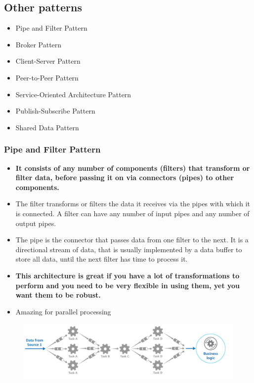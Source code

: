 \documentclass[a4paper]{article}
\begin{document}
\subsection{Other patterns}
\begin{itemize}
\item
  Pipe and Filter Pattern
\item
  Broker Pattern
\item
  Client-Server Pattern
\item
  Peer-to-Peer Pattern
\item
  Service-Oriented Architecture Pattern
\item
  Publish-Subscribe Pattern
\item
  Shared Data Pattern
\end{itemize}
\subsubsection{Pipe and Filter Pattern}
\begin{itemize}
\item  \textbf{It consists of any number of components (filters) that transform or filter data, before passing it on via connectors (pipes) to other components.}
\item The filter transforms or filters the data it receives via the pipes with which it is connected. A filter can have any number of input pipes and any number of output pipes.
\item The pipe is the connector that passes data from one filter to the next. It is a directional stream of data, that is usually implemented by a data buffer to store all data, until the next filter has time to process it.
\item \textbf{This architecture is great if you have a lot of transformations to perform and you need to be very flexible in using them, yet you want them to be robust.}
\item Amazing for parallel processing
\end{itemize}
\begin{figure}[h]
\centering 
\includegraphics[scale=0.6]{images/pnf.png}
\end{figure}
\end{document}
